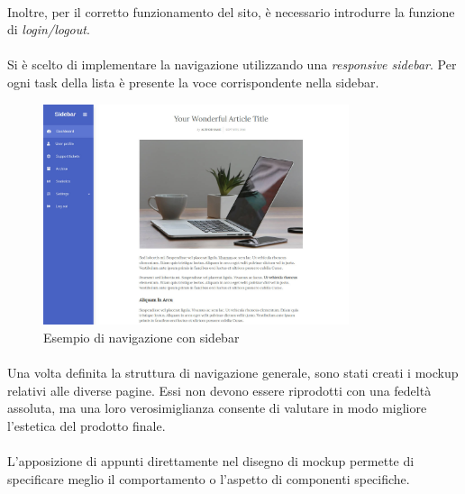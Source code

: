 \documentclass[11pt,a4paper,english]{article}
\begin{document}
\paragraph{} Inoltre, per il corretto funzionamento del sito, è necessario introdurre la funzione di \emph{login/logout}.

\paragraph{} Si è scelto di implementare la navigazione utilizzando una \emph{responsive sidebar}. Per ogni task della lista è presente la voce corrispondente nella sidebar. 

\begin{figure}[H]
    \centering
    \includegraphics[width=0.8\textwidth]{img/bootstrap-sidebar.jpg}
    \caption{Esempio di navigazione con sidebar}
\end{figure}

\paragraph{} Una volta definita la struttura di navigazione generale, sono stati creati i mockup relativi alle diverse pagine. Essi non devono essere riprodotti con una fedeltà assoluta, ma una loro verosimiglianza consente di valutare in modo migliore l'estetica del prodotto finale. 

\paragraph{} L'apposizione di appunti direttamente nel disegno di mockup permette di specificare meglio il comportamento o l'aspetto di componenti specifiche. 
\end{document}
